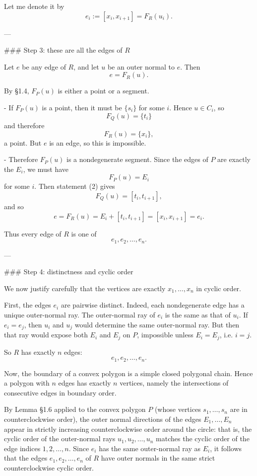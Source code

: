 Let me denote it by
\[
e_i:=[x_i,x_{i+1}]=F_R(u_i).
\]

---

### Step 3: these are all the edges of \(R\)

Let \(e\) be any edge of \(R\), and let \(u\) be an outer normal to \(e\). Then
\[
e=F_R(u).
\]

By §1.4, \(F_P(u)\) is either a point or a segment.

- If \(F_P(u)\) is a point, then it must be \(\{s_i\}\) for some \(i\). Hence \(u\in C_i\), so
  \[
  F_Q(u)=\{t_i\}
  \]
  and therefore
  \[
  F_R(u)=\{x_i\},
  \]
  a point. But \(e\) is an edge, so this is impossible.

- Therefore \(F_P(u)\) is a nondegenerate segment. Since the edges of \(P\) are exactly the \(E_i\), we must have
  \[
  F_P(u)=E_i
  \]
  for some \(i\). Then statement (2) gives
  \[
  F_Q(u)=[t_i,t_{i+1}],
  \]
  and so
  \[
  e=F_R(u)=E_i+[t_i,t_{i+1}]=[x_i,x_{i+1}]=e_i.
  \]

Thus every edge of \(R\) is one of
\[
e_1,e_2,\dots,e_n.
\]

---

### Step 4: distinctness and cyclic order

We now justify carefully that the vertices are exactly \(x_1,\dots,x_n\) in cyclic order.

First, the edges \(e_i\) are pairwise distinct. Indeed, each nondegenerate edge has a unique outer-normal ray. The outer-normal ray of \(e_i\) is the same as that of \(u_i\). If \(e_i=e_j\), then \(u_i\) and \(u_j\) would determine the same outer-normal ray. But then that ray would expose both \(E_i\) and \(E_j\) on \(P\), impossible unless \(E_i=E_j\), i.e. \(i=j\).

So \(R\) has exactly \(n\) edges:
\[
e_1,e_2,\dots,e_n.
\]

Now, the boundary of a convex polygon is a simple closed polygonal chain. Hence a polygon with \(n\) edges has exactly \(n\) vertices, namely the intersections of consecutive edges in boundary order.

By Lemma §1.6 applied to the convex polygon \(P\) (whose vertices \(s_1,\dots,s_n\) are in counterclockwise order), the outer normal directions of the edges \(E_1,\dots,E_n\) appear in strictly increasing counterclockwise order around the circle: that is, the cyclic order of the outer-normal rays \(u_1,u_2,\dots,u_n\) matches the cyclic order of the edge indices \(1,2,\dots,n\). Since \(e_i\) has the same outer-normal ray as \(E_i\), it follows that the edges \(e_1,e_2,\dots,e_n\) of \(R\) have outer normals in the same strict counterclockwise cyclic order.

